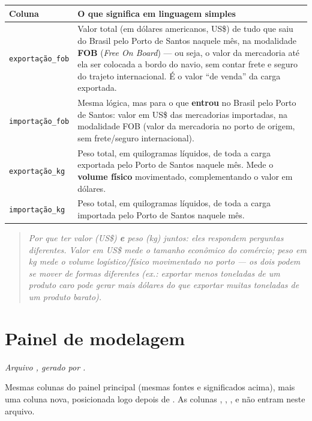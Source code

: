 \documentclass[11pt,a4paper]{article}
\begin{document}
\vspace{0.5em}
\begin{longtable}{L{3.2cm} L{11cm}}
\toprule
\textbf{Coluna} & \textbf{O que significa em linguagem simples} \\
\midrule
\endhead
\texttt{exportação\_\allowbreak fob} &
Valor total (em dólares americanos, US\$) de tudo que saiu do Brasil pelo Porto de Santos naquele mês, na modalidade \textbf{FOB} (\textit{Free On Board}) --- ou seja, o valor da mercadoria até ela ser colocada a bordo do navio, sem contar frete e seguro do trajeto internacional. É o valor ``de venda'' da carga exportada. \\[0.4em]
\texttt{importação\_\allowbreak fob} &
Mesma lógica, mas para o que \textbf{entrou} no Brasil pelo Porto de Santos: valor em US\$ das mercadorias importadas, na modalidade FOB (valor da mercadoria no porto de origem, sem frete/seguro internacional). \\[0.4em]
\texttt{exportação\_\allowbreak kg} &
Peso total, em quilogramas líquidos, de toda a carga exportada pelo Porto de Santos naquele mês. Mede o \textbf{volume físico} movimentado, complementando o valor em dólares. \\[0.4em]
\texttt{importação\_\allowbreak kg} &
Peso total, em quilogramas líquidos, de toda a carga importada pelo Porto de Santos naquele mês. \\
\bottomrule
\end{longtable}

\begin{quote}
\small\textit{Por que ter valor (US\$) \textbf{e} peso (kg) juntos: eles respondem perguntas diferentes. Valor em US\$ mede o tamanho econômico do comércio; peso em kg mede o volume logístico/físico movimentado no porto --- os dois podem se mover de formas diferentes (ex.: exportar menos toneladas de um produto caro pode gerar mais dólares do que exportar muitas toneladas de um produto barato).}
\end{quote}

\section*{Painel de modelagem}
\textit{Arquivo \texttt{}, gerado por \texttt{}.}

\vspace{0.3em}
\noindent Mesmas colunas do painel principal (mesmas fontes e significados acima), mais uma coluna nova, posicionada logo depois de \texttt{}. As colunas \texttt{}, \texttt{}, \texttt{}, \texttt{} e \texttt{} não entram neste arquivo.
\end{document}
